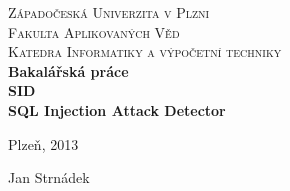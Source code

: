 \begin{titlepage}
\begin{center}
\textsc{\Large Západočeská Univerzita v Plzni}
\\[0.3cm]
\textsc{\Large Fakulta Aplikovaných Věd}
\\[0.3cm]
\textsc{\Large Katedra Informatiky a výpočetní techniky}
\\[6cm]
\textbf{\LARGE Bakalářská práce}
\\[3cm]
\textbf{\LARGE SID\\[0.3cm] SQL Injection Attack Detector}
\\[6cm]
\begin{minipage}{0.4\textwidth}
\begin{flushleft}
\large
Plzeň, 2013
\end{flushleft}
\end{minipage}
\begin{minipage}{0.4\textwidth}
\begin{flushright} 
Jan Strnádek
\end{flushright}
\end{minipage}
\vfill
\end{center}
\end{titlepage}